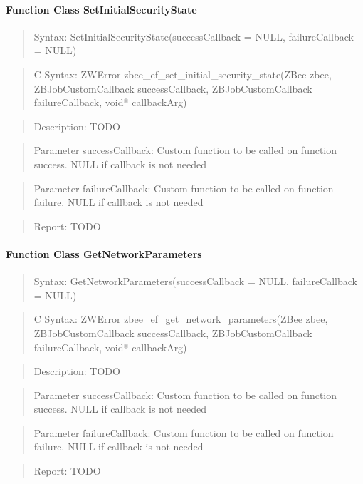\paragraph{Function Class SetInitialSecurityState}
\begin{quote}Syntax: SetInitialSecurityState(successCallback = NULL, failureCallback = NULL)\end{quote}
\begin{quote}C Syntax: ZWError zbee\_ef\_set\_initial\_security\_state(ZBee zbee, ZBJobCustomCallback successCallback, ZBJobCustomCallback failureCallback, void* callbackArg)\end{quote}
\begin{quote}Description: TODO\end{quote}
\begin{quote}Parameter successCallback: Custom function to be called on function success. NULL if callback is not needed\end{quote}
\begin{quote}Parameter failureCallback: Custom function to be called on function failure. NULL if callback is not needed\end{quote}
\begin{quote}Report: TODO\end{quote}

\paragraph{Function Class GetNetworkParameters}
\begin{quote}Syntax: GetNetworkParameters(successCallback = NULL, failureCallback = NULL)\end{quote}
\begin{quote}C Syntax: ZWError zbee\_ef\_get\_network\_parameters(ZBee zbee, ZBJobCustomCallback successCallback, ZBJobCustomCallback failureCallback, void* callbackArg)\end{quote}
\begin{quote}Description: TODO\end{quote}
\begin{quote}Parameter successCallback: Custom function to be called on function success. NULL if callback is not needed\end{quote}
\begin{quote}Parameter failureCallback: Custom function to be called on function failure. NULL if callback is not needed\end{quote}
\begin{quote}Report: TODO\end{quote}

